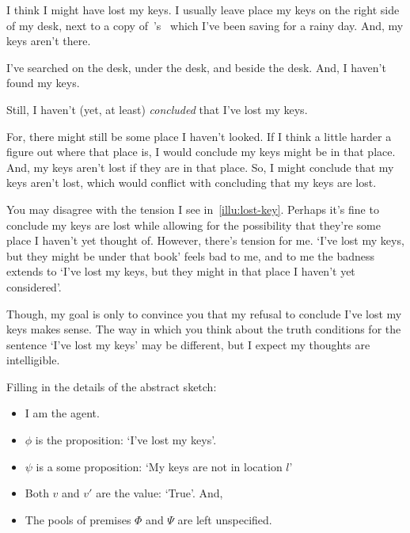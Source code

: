 \begin{note}
  \begin{illustration}
    \label{illu:lost-key}
    I think I might have lost my keys.
    I usually leave place my keys on the right side of my desk, next to a copy of~\citeauthor{Vickers:1989tr}'s~ which I've been saving for a rainy day.
    And, my keys aren't there.

    I've searched on the desk, under the desk, and beside the desk.
    And, I haven't found my keys.

    Still, I haven't (yet, at least) \emph{concluded} that I've lost my keys.

    For, there might still be some place I haven't looked.
    If I think a little harder a figure out where that place is, I would conclude my keys might be in that place.
    And, my keys aren't lost if they are in that place.
    So, I might conclude that my keys aren't lost, which would conflict with concluding that my keys are lost.
  \end{illustration}

  You may disagree with the tension I see in~\autoref{illu:lost-key}.
  Perhaps it's fine to conclude my keys are lost while allowing for the possibility that they're some place I haven't yet thought of.
  However, there's tension for me.
  `I've lost my keys, but they might be under that book' feels bad to me, and to me the badness extends to `I've lost my keys, but they might in that place I haven't yet considered'.

  Though, my goal is only to convince you that my refusal to conclude I've lost my keys makes sense.
  The way in which you think about the truth conditions for the sentence `I've lost my keys' may be different, but I expect my thoughts are intelligible.
\end{note}

\begin{note}
  Filling in the details of the abstract sketch:
  \begin{itemize}[noitemsep]
  \item
    I am the agent.
  \item
    \(\phi\) is the proposition: `I've lost my keys'.
  \item
    \(\psi\) is a some proposition: `My keys are not in location \(l\)'
  \item
    Both \(v\) and \(v'\) are the value: `True'.
    And,
  \item
    The pools of premises \(\Phi\) and \(\Psi\) are left unspecified.
  \end{itemize}
\end{note}

